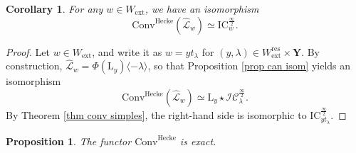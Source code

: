 \documentclass[11pt]{amsart}
\theoremstyle{plain}
\newtheorem{coro}[thm]{Corollary}
\newtheorem{prop}[thm]{Proposition}
\theoremstyle{remark}
\numberwithin{equation}{section}
\begin{document}
	\begin{coro}\label{coro simples}
		For any $w\in W_\mathrm{ext}$, we have an isomorphism
		$$\mathrm{Conv}^{\mathrm{Hecke}}(\widehat{\mathcal{L}}_w)\simeq\mathrm{IC}^{\frac{\infty}{2}}_w. $$
	\end{coro}
	\begin{proof}
		Let $w\in W_\mathrm{ext}$, and write it as $w=yt_\lambda$ for $(y,\lambda)\in W^{\mathrm{res}}_\mathrm{ext}\times\mathbf{Y}$. By construction, $\widehat{\mathcal{L}}_w=\Phi(\mathrm{L}_y)\langle-\lambda\rangle$, so that Proposition \ref{prop can isom} yields an isomorphism
		$$\mathrm{Conv}^{\mathrm{Hecke}}(\widehat{\mathcal{L}}_w)\simeq \mathrm{L}_y\star \mathcal{IC}^{\frac{\infty}{2}}_{\lambda}. $$
		By Theorem \ref{thm conv simples}, the right-hand side is isomorphic to $\mathrm{IC}^{\frac{\infty}{2}}_{yt_{\lambda}}$.
	\end{proof}
 	\begin{prop}{{\cite[Proposition 6.2.2]{ABBGM}}}\label{lem exact}
		The functor $\mathrm{Conv}^{\mathrm{Hecke}}$ is exact.
	\end{prop}
\end{document}
